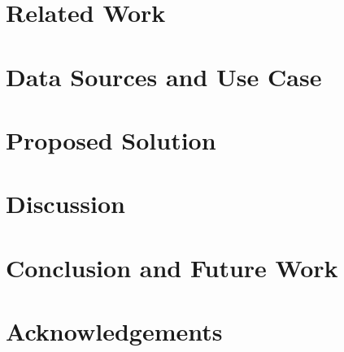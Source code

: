 \documentclass[runningheads]{llncs}
\begin{document}
\section{Related Work}
\label{sec:related-work}


\section{Data Sources and Use Case}
\label{sec:base-registries}


\section{Proposed Solution}
\label{sec:proposed-solution}


\section{Discussion}
\label{sec:discussion}


\section{Conclusion and Future Work}
\label{sec:conclusion-future-work}


\section*{Acknowledgements}
\label{sec:acknowledgements}


%
%
%


\end{document}
